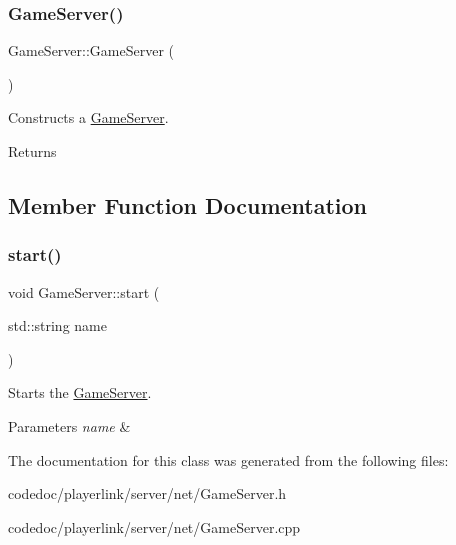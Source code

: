 \subsubsection{\texorpdfstring{Game\+Server()}{GameServer()}}
{\footnotesize\ttfamily Game\+Server\+::\+Game\+Server (\begin{DoxyParamCaption}{ }\end{DoxyParamCaption})}



Constructs a \hyperlink{classGameServer}{Game\+Server}. 

\begin{DoxyReturn}{Returns}

\end{DoxyReturn}


\subsection{Member Function Documentation}
\mbox{\label{classGameServer_affe7e5aff5265d16956d595f99650d0b}} 
\subsubsection{\texorpdfstring{start()}{start()}}
{\footnotesize\ttfamily void Game\+Server\+::start (\begin{DoxyParamCaption}\item[{std\+::string}]{name }\end{DoxyParamCaption})}



Starts the \hyperlink{classGameServer}{Game\+Server}. 


\begin{DoxyParams}{Parameters}
{\em name} & \\
\hline
\end{DoxyParams}


The documentation for this class was generated from the following files\+:\begin{DoxyCompactItemize}
\item 
codedoc/playerlink/server/net/Game\+Server.\+h\item 
codedoc/playerlink/server/net/Game\+Server.\+cpp\end{DoxyCompactItemize}
